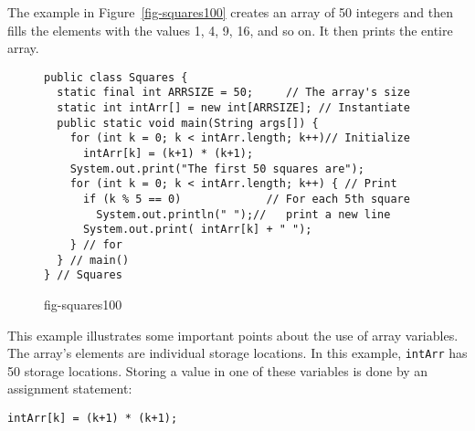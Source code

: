 \noindent The example in Figure~\ref{fig-squares100} creates an array of 50
integers and then fills the elements with the values 1, 4, 9, 16, and
so on.  It then prints the entire array.
\begin{figure}[h!]
\jjjprogstart
\begin{jjjlisting}
\begin{lstlisting}
public class Squares {
  static final int ARRSIZE = 50;     // The array's size
  static int intArr[] = new int[ARRSIZE]; // Instantiate
  public static void main(String args[]) {
    for (int k = 0; k < intArr.length; k++)// Initialize
      intArr[k] = (k+1) * (k+1);
    System.out.print("The first 50 squares are"); 
    for (int k = 0; k < intArr.length; k++) { // Print
      if (k % 5 == 0)             // For each 5th square
        System.out.println(" ");//   print a new line
      System.out.print( intArr[k] + " ");
    } // for
  } // main()
} // Squares
\end{lstlisting}
\end{jjjlisting}
{fig-squares100}
\end{figure}


This example illustrates some important points about the use of
array variables.  The array's elements are individual
storage locations.  In this example, {\tt intArr}
has 50 storage locations.  Storing a value in one of these variables
is done by an assignment statement:

\begin{jjjlisting}
\begin{lstlisting}
intArr[k] = (k+1) * (k+1);
\end{lstlisting}
\end{jjjlisting}

